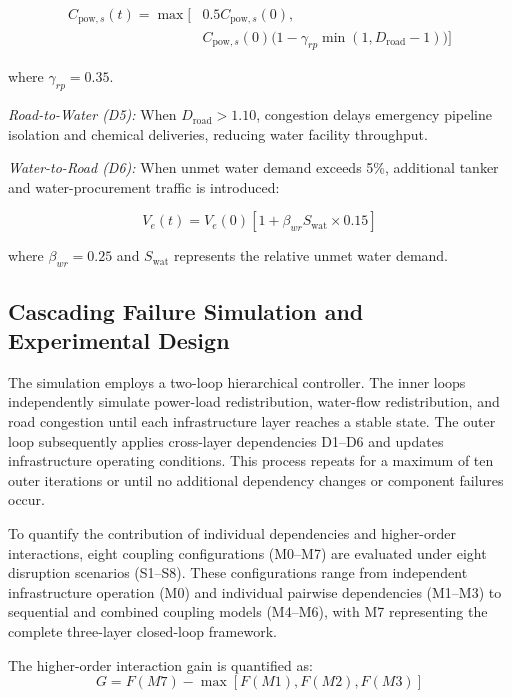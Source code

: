 \documentclass[oneside]{ieeeaccess}
\begin{document}
\begin{equation}
\begin{aligned}
C_{\mathrm{pow},s}(t)=\max\Big[&
0.5C_{\mathrm{pow},s}(0),\\
&C_{\mathrm{pow},s}(0)
\big(1-\gamma_{rp}\min(1,D_{\mathrm{road}}-1)\big)
\Big]
\end{aligned}
\label{eq:rp}
\end{equation}

where $\gamma_{rp}=0.35$.

\textit{Road-to-Water (D5):} When $D_{\mathrm{road}}>1.10$, congestion delays emergency pipeline isolation and chemical deliveries, reducing water facility throughput.

\textit{Water-to-Road (D6):} When unmet water demand exceeds 5\%, additional tanker and water-procurement traffic is introduced:

\begin{equation}
V_e(t)=V_e(0)[1+\beta_{wr}S_{\mathrm{wat}}\times0.15]
\label{eq:wr}
\end{equation}

where $\beta_{wr}=0.25$ and $S_{\mathrm{wat}}$ represents the relative unmet water demand.

\subsection{Cascading Failure Simulation and Experimental Design}

The simulation employs a two-loop hierarchical controller. The inner loops independently simulate power-load redistribution, water-flow redistribution, and road congestion until each infrastructure layer reaches a stable state. The outer loop subsequently applies cross-layer dependencies D1--D6 and updates infrastructure operating conditions. This process repeats for a maximum of ten outer iterations or until no additional dependency changes or component failures occur.

To quantify the contribution of individual dependencies and higher-order interactions, eight coupling configurations (M0--M7) are evaluated under eight disruption scenarios (S1--S8). These configurations range from independent infrastructure operation (M0) and individual pairwise dependencies (M1--M3) to sequential and combined coupling models (M4--M6), with M7 representing the complete three-layer closed-loop framework.

The higher-order interaction gain is quantified as:
\begin{equation}
G=F(M7)-\max[F(M1),F(M2),F(M3)]
\label{eq:gain}
\end{equation}
\end{document}
